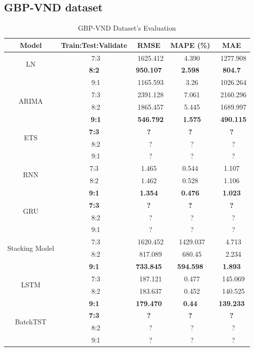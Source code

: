 \documentclass{ieeeojies}
\begin{document}
\subsection{GBP-VND dataset} 
\begin{table}[H]
    \centering
    \begin{tabular}{|c|c|c|c|c|}
         \hline
         \centering Model & Train:Test:Validate & RMSE & MAPE (\%) & MAE\\
         \hline
         \multirow{2}{*}{LN} &\ 7:3  &\ 1625.412 &\ 4.390 &\ 1277.908  \\ &\textbf{8:2} &\textbf{950.107} &\textbf{2.598} &\textbf{804.7} \\&\ 9:1 &\ 1165.593 &\ 3.26 &\ 1026.264 \\
         \hline
         \multirow{2}{*}{ARIMA} &\ 7:3 &\ 2391.128&\ 7.061 &\ 2160.296 \\ &\ 8:2 &\ 1865.457 &\ 5.445 &\ 1689.997 \\&\ \textbf{9:1} &\ \textbf{546.792} &\ \textbf{1.575} &\ \textbf{490.115} \\
         \hline
         \multirow{2}{*}{ETS} &\textbf{7:3} &\textbf{?}&\textbf{?}&\textbf{?} \\ &\ 8:2 &\ ?&\ ? &\ ? \\&\ 9:1 &\ ? &\ ? &\ ? \\
         \hline
         \multirow{2}{*}{RNN} & 7:3 & 1.465 & 0.544 & 1.107  \\ & 8:2 & 1.462 & 0.528 & 1.106 \\&\textbf{ 9:1} & \textbf{1.354} &\textbf{ 0.476} &\textbf{ 1.023} \\
         \hline
         \multirow{2}{*}{GRU} &\textbf{7:3} &\textbf{?}&\textbf{?}&\textbf{?} \\ &\ 8:2 &\ ?&\ ? &\ ? \\&\ 9:1 &\ ? &\ ? &\ ? \\
         \hline
         \multirow{2}{*}{Stacking Model} &\ 7:3 &\ 1620.452&\ 1429.037&\ 4.713 \\ &\ 8:2 &\ 817.089&\ 680.45 &\ 2.234 \\&\textbf{9:1} &\textbf{733.845} &\textbf{594.598} &\textbf{1.893} \\
         \hline
          \multirow{2}{*}{LSTM} &\ 7:3 &\ 187.121 &\ 0.477 &\ 145.069 \\ &\ 8:2 &\ 183.637 &\ 0.452 &\ 140.525 \\&\textbf{9:1} &\textbf{179.470} &\textbf{0.44} &\textbf{139.233} \\
         \hline
         \multirow{2}{*}{BatchTST} &\textbf{7:3} &\textbf{?}&\textbf{?}&\textbf{?} \\ &\ 8:2 &\ ?&\ ? &\ ? \\&\ 9:1 &\ ? &\ ? &\ ? \\
         \hline
    \end{tabular}
    \caption{GBP-VND Dataset's Evaluation}
    \label{mbbresult}
\end{table}
\end{document}

